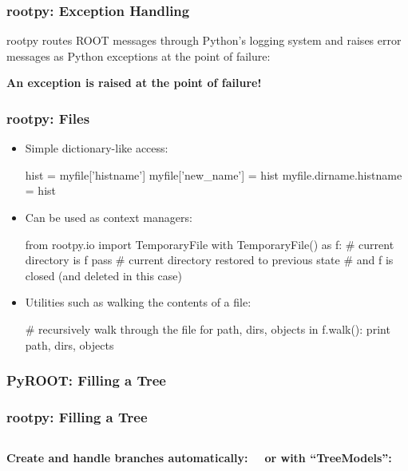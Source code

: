 \documentclass[10pt,professionalfonts,serif,usenames,dvipsnames,svgnames,table]{beamer}
\begin{document}
\begin{frame}[fragile]
    \frametitle{rootpy: Exception Handling}

rootpy routes ROOT messages through Python's logging system and raises error
messages as Python exceptions at the point of failure:

    
    \vspace{-.5cm}
    
    \begin{center}
        \vspace{-.5cm}
    {\bf An exception is raised at the point of failure!}
    \end{center}
\end{frame}

\begin{frame}[fragile]
    \frametitle{rootpy: Files}
    \begin{itemize}
\item Simple dictionary-like access:
\begin{pyglist}[language=python,style=vs]
hist = myfile['histname']
myfile['new_name'] = hist
myfile.dirname.histname = hist
\end{pyglist}
    \item Can be used as context managers:
\begin{pyglist}[language=python,style=vs]
from rootpy.io import TemporaryFile
with TemporaryFile() as f:
    # current directory is f
    pass
# current directory restored to previous state
# and f is closed (and deleted in this case)
\end{pyglist}
    \item Utilities such as walking the contents of a file:   
\begin{pyglist}[language=python,style=vs]
# recursively walk through the file
for path, dirs, objects in f.walk():
    print path, dirs, objects
\end{pyglist}
\end{itemize}
\end{frame}

\begin{frame}[fragile]
    \frametitle{PyROOT: Filling a Tree}
    
\end{frame}

\begin{frame}[fragile]
    \frametitle{rootpy: Filling a Tree}
    \begin{columns}
        {\bf Create and handle branches automatically:}
        
        {\bf or with ``TreeModels'':}
        
    \end{columns}
\end{frame}
\end{document}
